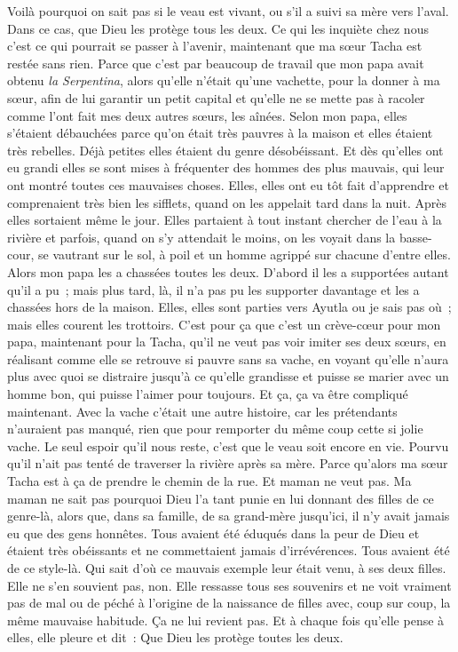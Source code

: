 \pend
%
\pstart
	Voilà pourquoi on sait pas si le veau est vivant, ou s’il a suivi sa mère vers l'aval. Dans ce cas, que Dieu les protège tous les deux.
\pend
%
\pstart
	Ce qui les inquiète chez nous c’est ce qui pourrait se passer à l’avenir, maintenant que ma sœur Tacha est restée sans rien. Parce que c’est par beaucoup de travail que mon papa avait obtenu \textit{la Serpentina}, alors qu’elle n’était qu’une vachette, pour la donner à ma sœur, afin de lui garantir un petit capital et qu’elle ne se mette pas à racoler comme l’ont fait mes deux autres sœurs, les aînées.
\pend
%
\pstart
	Selon mon papa, elles s’étaient débauchées parce qu'on était très pauvres à la maison et elles étaient très rebelles. Déjà petites elles étaient du genre désobéissant. Et dès qu’elles ont eu grandi elles se sont mises à fréquenter des hommes des plus mauvais, qui leur ont montré toutes ces mauvaises choses. Elles, elles ont eu tôt fait d’apprendre et comprenaient très bien les sifflets, quand on les appelait tard dans la nuit. Après elles sortaient même le jour. Elles partaient à tout instant chercher de l’eau à la rivière et parfois, quand on s’y attendait le moins, on les voyait dans la basse-cour, se vautrant sur le sol, à poil et un homme agrippé sur chacune d’entre elles.
\pend
%
\pstart
	Alors mon papa les a chassées toutes les deux. D’abord il les a supportées autant qu’il a pu ; mais plus tard, là, il n’a pas pu les supporter davantage et les a chassées hors de la maison. Elles, elles sont parties vers Ayutla ou je sais pas où ; mais elles courent les trottoirs.
\pend
%
\pstart
	C’est pour ça que c’est un crève-cœur pour mon papa, maintenant pour la Tacha, qu’il ne veut pas voir imiter ses deux sœurs, en réalisant comme elle se retrouve si pauvre sans sa vache, en voyant qu’elle n’aura plus avec quoi se distraire jusqu’à ce qu’elle grandisse et puisse se marier avec un homme bon, qui puisse l’aimer pour toujours. Et ça, ça va être compliqué maintenant. Avec la vache c’était une autre histoire, car les prétendants n’auraient pas manqué, rien que pour remporter du même coup cette si jolie vache.
\pend
%
\pstart
	Le seul espoir qu’il nous reste, c’est que le veau soit encore en vie. Pourvu qu’il n’ait pas tenté de traverser la rivière après sa mère. Parce qu’alors ma sœur Tacha est à ça de prendre le chemin de la rue. Et maman ne veut pas.
\pend
%
\pstart
	Ma maman ne sait pas pourquoi Dieu l’a tant punie en lui donnant des filles de ce genre-là, alors que, dans sa famille, de sa grand-mère jusqu’ici, il n'y avait jamais eu que des gens honnêtes. Tous avaient été éduqués dans la peur de Dieu et étaient très obéissants et ne commettaient jamais d’irrévérences. Tous avaient été de ce style-là. Qui sait d’où ce mauvais exemple leur était venu, à ses deux filles. Elle ne s’en souvient pas, non. Elle ressasse tous ses souvenirs et ne voit vraiment pas de mal ou de péché à l’origine de la naissance de filles avec, coup sur coup, la même mauvaise habitude. Ça ne lui revient pas. Et à chaque fois qu’elle pense à elles, elle pleure et dit : \og{}Que Dieu les protège toutes les deux.\fg
